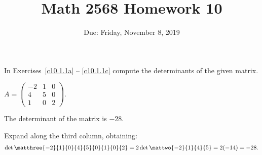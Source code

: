 \documentclass{article}
\title{Math 2568 Homework 10}
\author{\phantom{Dr. Golubitsky}}
\date{Due: Friday, November 8, 2019}
\begin{document}
\maketitle


\problemlabel

\noindent  In Exercises~\ref{c10.1.1a} -- \ref{c10.1.1c} compute the 
determinants of the given matrix.


\begin{exercise} \label{c10.1.1a}
$A = \left(\begin{array}{rrr} -2 & 1 & 0 \\ 4 & 5& 0 \\ 1 & 0 & 2
\end{array} \right)$.

\begin{solution}

\ans The determinant of the matrix is $-28$.

\soln Expand along the third column, obtaining:
\[
\det\matthree{-2}{1}{0}{4}{5}{0}{1}{0}{2} = 2\det\mattwo{-2}{1}{4}{5}
= 2(-14) = -28.
\]

\end{solution}
\end{exercise} 





\problemlabel
\end{document}
